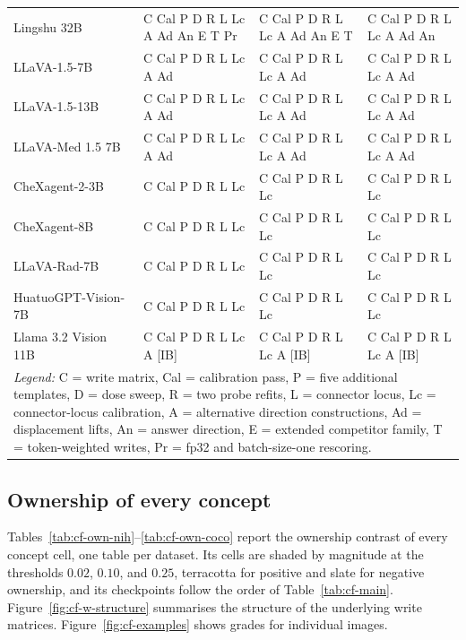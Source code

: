 \documentclass{article}
\begin{document}
\begin{table}[htbp]
\begin{tabular}{llll}
Lingshu 32B & C Cal P D R L Lc A Ad An E T Pr & C Cal P D R L Lc A Ad An E T & C Cal P D R L Lc A Ad An \\
LLaVA-1.5-7B & C Cal P D R L Lc A Ad & C Cal P D R L Lc A Ad & C Cal P D R L Lc A Ad \\
LLaVA-1.5-13B & C Cal P D R L Lc A Ad & C Cal P D R L Lc A Ad & C Cal P D R L Lc A Ad \\
LLaVA-Med 1.5 7B & C Cal P D R L Lc A Ad & C Cal P D R L Lc A Ad & C Cal P D R L Lc A Ad \\
CheXagent-2-3B & C Cal P D R L Lc & C Cal P D R L Lc & C Cal P D R L Lc \\
CheXagent-8B & C Cal P D R L Lc & C Cal P D R L Lc & C Cal P D R L Lc \\
LLaVA-Rad-7B & C Cal P D R L Lc & C Cal P D R L Lc & C Cal P D R L Lc \\
HuatuoGPT-Vision-7B & C Cal P D R L Lc & C Cal P D R L Lc & C Cal P D R L Lc \\
Llama 3.2 Vision 11B & C Cal P D R L Lc A [IB] & C Cal P D R L Lc A [IB] & C Cal P D R L Lc A [IB] \\
\midrule
\multicolumn{4}{p{0.95\textwidth}}{\textit{Legend:} C = write matrix, Cal = calibration pass, P = five additional templates, D = dose sweep, R = two probe refits, L = connector locus, Lc = connector-locus calibration, A = alternative direction constructions, Ad = displacement lifts, An = answer direction, E = extended competitor family, T = token-weighted writes, Pr = fp32 and batch-size-one rescoring.} \\
\bottomrule
\end{tabular}
\end{table}

\subsection{Ownership of every concept}
\label{app:cf-tables}

Tables~\ref{tab:cf-own-nih}--\ref{tab:cf-own-coco} report the ownership contrast of every concept cell, one table per dataset. Its cells are shaded by magnitude at the thresholds $0.02$, $0.10$, and $0.25$, terracotta for positive and slate for negative ownership, and its checkpoints follow the order of Table~\ref{tab:cf-main}. Figure~\ref{fig:cf-w-structure} summarises the structure of the underlying write matrices. Figure~\ref{fig:cf-examples} shows grades for individual images.
\end{document}
